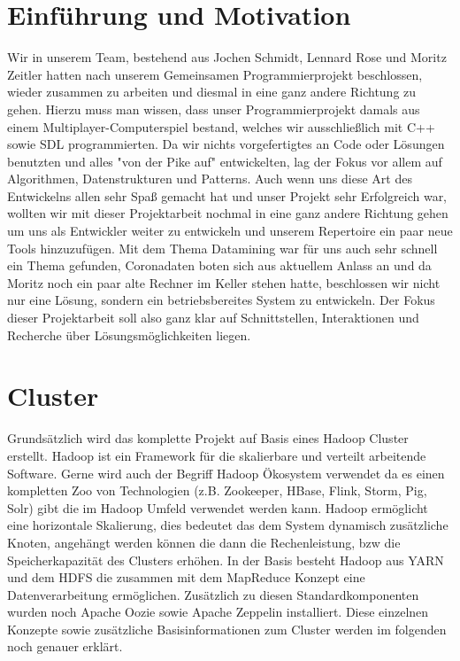\documentclass[12pt,oneside,a4paper,parskip]{scrbook}
\begin{document}
\chapter{Einführung und Motivation}\label{ch:intro}
Wir in unserem Team, bestehend aus Jochen Schmidt, Lennard Rose und Moritz Zeitler hatten nach unserem Gemeinsamen Programmierprojekt beschlossen, wieder zusammen zu arbeiten und diesmal in eine ganz andere Richtung zu gehen. Hierzu muss man wissen, dass unser Programmierprojekt damals aus einem Multiplayer-Computerspiel bestand, welches wir ausschließlich mit C++ sowie SDL programmierten. Da wir nichts vorgefertigtes an Code oder Lösungen benutzten und alles "von der Pike auf"  entwickelten, lag der Fokus vor allem auf Algorithmen, Datenstrukturen und Patterns. Auch wenn uns diese Art des Entwickelns allen sehr Spaß gemacht hat und unser Projekt sehr Erfolgreich war, wollten wir mit dieser Projektarbeit nochmal in eine ganz andere Richtung gehen um uns als Entwickler weiter zu entwickeln und unserem Repertoire ein paar neue Tools hinzuzufügen. Mit dem Thema Datamining war für uns auch sehr schnell ein Thema gefunden, Coronadaten boten sich aus aktuellem Anlass an und da Moritz noch ein paar alte Rechner im Keller stehen hatte, beschlossen wir nicht nur eine Lösung, sondern ein betriebsbereites System zu entwickeln. \newline
Der Fokus dieser Projektarbeit soll also ganz klar auf Schnittstellen, Interaktionen und Recherche über Lösungsmöglichkeiten liegen. 


\chapter{Cluster}
Grunds\"atzlich wird das komplette Projekt auf Basis eines Hadoop Cluster erstellt. Hadoop ist ein Framework f\"ur die skalierbare und verteilt arbeitende Software. Gerne wird auch der Begriff  Hadoop \"Okosystem verwendet da es einen kompletten Zoo von Technologien (z.B. Zookeeper, HBase, Flink, Storm, Pig, Solr) gibt die im Hadoop Umfeld verwendet werden kann. Hadoop erm\"oglicht eine horizontale Skalierung, dies bedeutet das dem System dynamisch zus\"atzliche Knoten, angeh\"angt werden k\"onnen die dann die Rechenleistung, bzw die Speicherkapazit\"at des Clusters erh\"ohen. In der Basis besteht Hadoop aus YARN und dem HDFS die zusammen mit dem MapReduce Konzept eine Datenverarbeitung erm\"oglichen. Zus\"atzlich zu diesen Standardkomponenten wurden noch Apache Oozie sowie Apache Zeppelin installiert. Diese einzelnen Konzepte sowie zus\"atzliche Basisinformationen zum Cluster werden im folgenden noch genauer erkl\"art.
\end{document}
